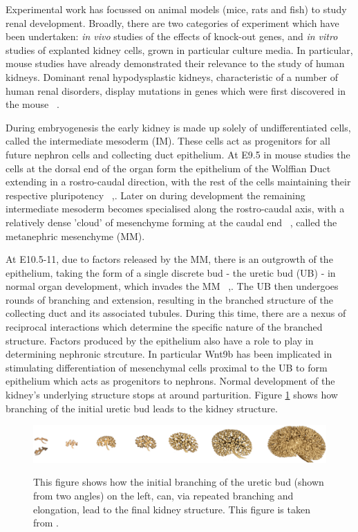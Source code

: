 \documentclass[pdftex,10pt,a4paper,twocolumn]{article}
\begin{document}
Experimental work has focussed on animal models (mice, rats and fish) to study renal development. Broadly, there are two categories of experiment which have been undertaken: \textit{in vivo} studies of the effects of knock-out genes, and \textit{in vitro} studies of explanted kidney cells, grown in particular culture media. In particular, mouse studies have already demonstrated their relevance to the study of human kidneys. Dominant renal hypodysplastic kidneys, characteristic of a number of human renal disorders, display mutations in genes which were first discovered in the mouse ~\cite{LittleMMcMahon2012}.

During embryogenesis the early kidney is made up solely of undifferentiated cells, called the intermediate mesoderm (IM). These cells act as progenitors for all future nephron cells and collecting duct epithelium. At E9.5 in mouse studies the cells at the dorsal end of the organ form the epithelium of the Wolffian Duct extending in a rostro-caudal direction, with the rest of the cells maintaining their respective pluripotency ~\cite{CostantiniFKopan2010},\cite{saxen1987early}. Later on during development the remaining intermediate mesoderm becomes specialised along the rostro-caudal axis, with a relatively dense 'cloud' of mesenchyme forming at the caudal end ~\cite{CostantiniFKopan2010}, called the metanephric mesenchyme (MM).

At E10.5-11, due to factors released by the MM, there is an outgrowth of the epithelium, taking the form of a single discrete bud - the uretic bud (UB) - in normal organ development, which invades the MM ~\cite{CostantiniFKopan2010},\cite{LittleMMcMahon2012}. The UB then undergoes rounds of branching and extension, resulting in the branched structure of the collecting duct and its associated tubules. During this time, there are a nexus of reciprocal interactions which determine the specific nature of the branched structure. Factors produced by the epithelium also have a role to play in determining nephronic strcuture. In particular Wnt9b has been implicated in stimulating differentiation of mesenchymal cells proximal to the UB to form epithelium which acts as progenitors to nephrons. Normal development of the kidney's underlying structure stops at around parturition. Figure \ref{fig:real-branching} shows how branching of the initial uretic bud leads to the kidney structure.

\begin{figure}[t] 
\centering
\scalebox{0.5} 
{\includegraphics{real-branching.eps}}
\caption{This figure shows how the initial branching of the uretic bud (shown from two angles) on the left, can, via repeated branching and elongation, lead to the final kidney structure. This figure is taken from \cite{short2014global}.}\label{fig:real-branching}
\end{figure} 
\end{document}
